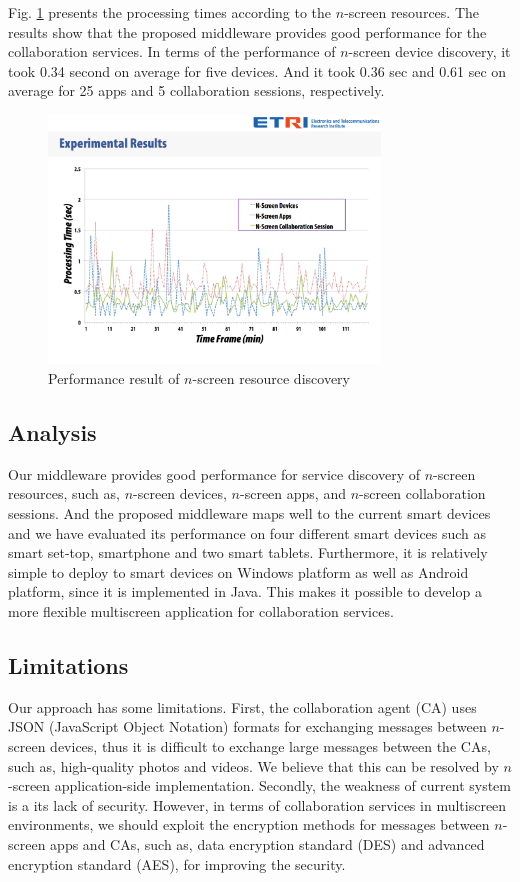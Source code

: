 \documentclass[conference]{IEEEtran}
\begin{document}
Fig. \ref{fig:performance} presents the processing times according to the $n$-screen resources. 
The results show that the proposed middleware provides good performance for the collaboration services. 
In terms of the performance of $n$-screen device discovery, it took 0.34 second on average for five devices. And it took 0.36 sec and 0.61 sec on average for 25 apps and 5 collaboration sessions, respectively.

    \begin{figure}[htb] %
    \centering
    \includegraphics[width=8.8cm,keepaspectratio]{performance}
    \caption{Performance result of $n$-screen resource discovery}
    \label{fig:performance}
    \end{figure}


\subsection{Analysis} 
Our middleware provides good performance for service discovery of $n$-screen resources, such as, $n$-screen devices, $n$-screen apps, and $n$-screen collaboration sessions.
And the proposed middleware maps well to the current smart devices and we have evaluated its performance on four different smart devices such as smart set-top,  smartphone and two smart tablets.
Furthermore, it is relatively simple to deploy to smart devices on Windows platform as well as Android platform, since it is implemented in Java.
This makes it possible to develop a more flexible multiscreen application for collaboration services. 

\subsection{Limitations}
    Our approach has some limitations.
    First, the collaboration agent (CA) uses JSON (JavaScript Object Notation) formats for exchanging messages between $n$-screen devices, thus it is difficult to exchange large messages between the CAs, such as, high-quality photos and videos.  We believe that this can be resolved by $n$-screen application-side implementation.
  Secondly, the weakness of current system is a its lack of security.
  However, in terms of collaboration services in multiscreen environments, we should exploit the encryption methods for messages between $n$-screen apps and CAs, such as, data encryption standard (DES) and advanced encryption standard (AES), for improving the security.
\end{document}
